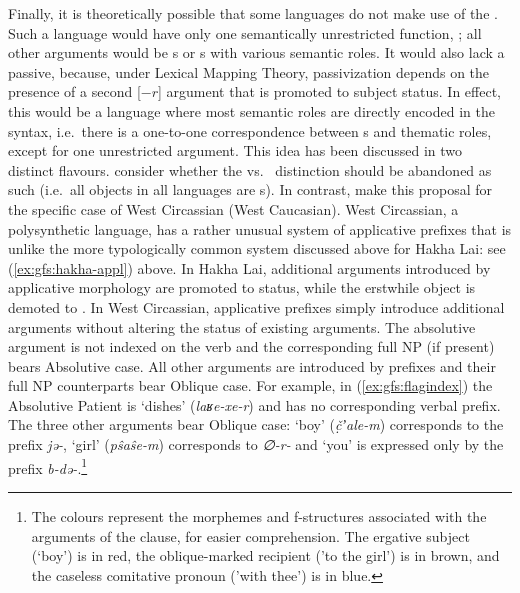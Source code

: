\documentclass[output=paper]{../langscibook}
\begin{document}
 Finally, it is theoretically possible that some languages do not make use of the \GF \OBJ. Such a language would have only one semantically unrestricted function, \SUBJ; all other arguments would be {\OBJTHETA}s or {\OBLTHETA}s with various semantic roles. It would also lack a passive, because, under Lexical Mapping Theory, passivization depends on the presence of a second [$-r$] argument that is promoted to subject status. In effect, this would be a language where most semantic roles are directly encoded in the syntax, i.e.\ there is a one-to-one correspondence between {\GF}s and thematic roles, except for one unrestricted argument. This idea has been discussed in two distinct flavours. \citet{borjvinc08} consider whether the \OBJ vs.\ {\OBJTHETA} distinction should be abandoned as such (i.e.\ all objects in all languages are {\OBJTHETA}s). In contrast, \citet{lander-etal2021} make this proposal for the specific case of West Circassian (West Caucasian). West Circassian, a polysynthetic language, has a rather unusual system of applicative prefixes that is unlike the more typologically common system discussed above for Hakha Lai: see (\ref{ex:gfs:hakha-appl}) above. In Hakha Lai, additional arguments introduced by applicative morphology are promoted to \OBJ status, while the erstwhile object is demoted to {\OBJTHETA}. In West Circassian, applicative prefixes simply introduce additional arguments without altering the status of existing arguments. The absolutive argument is not indexed on the verb and the corresponding full NP (if present) bears Absolutive case. All other arguments are introduced by prefixes and their full NP counterparts bear Oblique case. For example, in (\ref{ex:gfs:flagindex}) the Absolutive Patient is `dishes' (\textit{laʁe-xe-r}) and has no corresponding verbal prefix. The three other arguments bear Oblique case: `boy' (\textit{č̣ʼale-m}) corresponds to the prefix \textit{jə-}, `girl' (\textit{pŝaŝe-m}) corresponds to \textit{∅-r-} and `you' is expressed only by the prefix \textit{b-də-}.\footnote{The colours represent the morphemes and f-structures associated with the arguments of the clause, for easier comprehension. The ergative subject (`boy') is in red, the oblique-marked recipient ('to the girl') is in brown, and the caseless comitative pronoun ('with thee') is in blue.}
 
\end{document}
